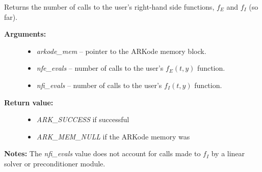 \documentclass[letterpaper,10pt,english]{sphinxmanual}
\begin{document}
\begin{fulllineitems}
\label{c_interface/User_callable:c.ARKodeGetNumRhsEvals}
Returns the number of calls to the user's right-hand
side functions, \(f_E\) and \(f_I\) (so far).
\begin{description}
\item[{\textbf{Arguments:}}] \leavevmode\begin{itemize}
\item {} 
\emph{arkode\_mem} -- pointer to the ARKode memory block.

\item {} 
\emph{nfe\_evals} -- number of calls to the user's \(f_E(t,y)\) function.

\item {} 
\emph{nfi\_evals} -- number of calls to the user's \(f_I(t,y)\) function.

\end{itemize}

\item[{\textbf{Return value:}}] \leavevmode\begin{itemize}
\item {} 
\emph{ARK\_SUCCESS} if successful

\item {} 
\emph{ARK\_MEM\_NULL} if the ARKode memory was 

\end{itemize}

\end{description}

\textbf{Notes:} The \emph{nfi\_evals} value does not account for calls made to
\(f_I\) by a linear solver or preconditioner module.

\end{fulllineitems}

\end{document}
